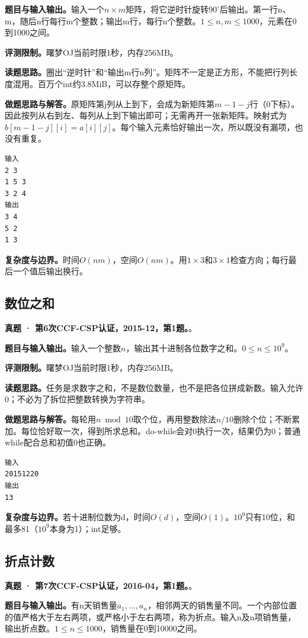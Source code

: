 \noindent\textbf{题目与输入输出。}输入一个$n\times m$矩阵，将它逆时针旋转$90^\circ$后输出。第一行n、m，随后n行每行m个整数；输出m行，每行n个整数。$1\le n,m\le1000$，元素在0到1000之间。

\noindent\textbf{评测限制。}曙梦OJ当前时限1秒，内存256MB。

\noindent\textbf{读题思路。}圈出“逆时针”和“输出m行n列”。矩阵不一定是正方形，不能把行列长度混用。百万个int约3.8MiB，可以存整个原矩阵。

\noindent\textbf{做题思路与解答。}原矩阵第j列从上到下，会成为新矩阵第$m-1-j$行（0下标）。因此按列从右到左、每列从上到下输出即可；无需再开一张新矩阵。映射式为$b[m-1-j][i]=a[i][j]$。每个输入元素恰好输出一次，所以既没有漏项，也没有重复。
\begin{verbatim}
输入
2 3
1 5 3
3 2 4
输出
3 4
5 2
1 3
\end{verbatim}

\noindent\textbf{复杂度与边界。}时间$O(nm)$，空间$O(nm)$。用$1\times3$和$3\times1$检查方向；每行最后一个值后输出换行。
\subsection{数位之和}
\textbf{真题 · 第6次CCF-CSP认证，2015-12，第1题。}。

\noindent\textbf{题目与输入输出。}输入一个整数$n$，输出其十进制各位数字之和。$0\le n\le10^9$。

\noindent\textbf{评测限制。}曙梦OJ当前时限1秒，内存256MB。

\noindent\textbf{读题思路。}任务是求数字之和，不是数位数量，也不是把各位拼成新数。输入允许0；不必为了拆位把整数转换为字符串。

\noindent\textbf{做题思路与解答。}每轮用$n\bmod10$取个位，再用整数除法$n/10$删除个位；不断累加。每位恰好取一次，得到所求总和。do-while会对0执行一次，结果仍为0；普通while配合总和初值0也正确。
\begin{verbatim}
输入
20151220
输出
13
\end{verbatim}

\noindent\textbf{复杂度与边界。}若十进制位数为d，时间$O(d)$，空间$O(1)$。$10^9$只有10位，和最多81（$10^9$本身为1）；int足够。
\subsection{折点计数}
\textbf{真题 · 第7次CCF-CSP认证，2016-04，第1题。}。

\noindent\textbf{题目与输入输出。}有n天销售量$a_1,\ldots,a_n$，相邻两天的销售量不同。一个内部位置的值严格大于左右两项，或严格小于左右两项，称为折点。输入n及n项销售量，输出折点数。$1\le n\le1000$，销售量在0到10000之间。

